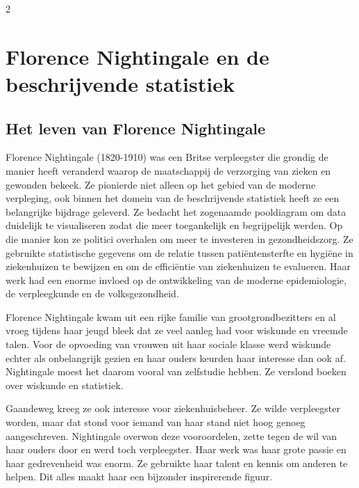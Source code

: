  \clearpage
 \begin{multicols}{2}

	\section{Florence Nightingale en de beschrijvende statistiek}
	
	\subsection*{Het leven van Florence Nightingale}
	Florence Nightingale (1820-1910) was een Britse verpleegster die grondig de manier heeft veranderd waarop de maatschappij de verzorging van zieken en gewonden bekeek. Ze pionierde niet alleen op het gebied van de moderne verpleging, ook binnen het domein van de beschrijvende statistiek heeft ze een belangrijke bijdrage geleverd. Ze bedacht het zogenaamde pooldiagram om data duidelijk te visualiseren zodat die meer toegankelijk en begrijpelijk werden. Op die manier kon ze politici overhalen om meer te investeren in gezondheidszorg. Ze gebruikte statistische gegevens om de relatie tussen patiëntensterfte en hygiëne in ziekenhuizen te bewijzen en om de efficiëntie van ziekenhuizen te evalueren. Haar werk had een enorme invloed op de ontwikkeling van de moderne epidemiologie, de verpleegkunde en de volksgezondheid.
	
	
		
	Florence Nightingale kwam uit een rijke familie van grootgrondbezitters en al vroeg tijdens haar jeugd bleek dat ze veel aanleg had voor wiskunde en vreemde talen. Voor de opvoeding van vrouwen uit haar sociale klasse werd wiskunde echter als onbelangrijk gezien en haar ouders keurden haar interesse dan ook af. Nightingale moest het daarom vooral van zelfstudie hebben. Ze verslond boeken over wiskunde en statistiek. 
 
 Gaandeweg kreeg ze ook interesse voor ziekenhuisbeheer. Ze wilde verpleegster worden, maar dat stond voor iemand van haar stand niet hoog genoeg aangeschreven. Nightingale overwon deze vooroordelen, zette tegen de wil van haar ouders door en werd toch verpleegster. Haar werk was haar grote passie en haar gedrevenheid was enorm. Ze gebruikte haar talent en kennis om anderen te helpen. Dit alles maakt haar een bijzonder inspirerende figuur.
	

\end{multicols}
